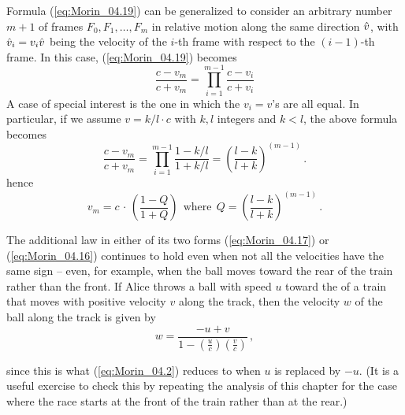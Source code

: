 \parindent=0pt  %
\parbox{\textwidth}{\begin{mdframed}[style=MyFrame] %
Formula (\ref{eq:Morin_04.19}) can be generalized to consider an arbitrary number $m+1$ of frames $F_0, F_1, \ldots, F_{m}$ in relative motion along the same direction $\hat{v}$, with $\hat{v}_i = v_i \hat{v}$ being the velocity of the $i$-th frame with respect to the $(i-1)$-th frame. 
In this case, (\ref{eq:Morin_04.19}) becomes 
\begin{equation*}
\frac{c - v_m}{c + v_m} = \prod_{i=1}^{m-1} \frac{c - v_i}{c + v_i} 
\end{equation*}
A case of special interest is the one in which the $v_i = v$'s are all equal. In particular, if we assume $v = k/l \cdot c$ with $k,l$ integers and $k < l$, the above formula becomes 
\begin{equation*}
\frac{c - v_m}{c + v_m} = \prod_{i=1}^{m-1} \frac{1 - k/l}{1 + k/l} = \left( \frac{l-k}{l+k} \right)^{(m-1)}\,.
\end{equation*}
hence
\begin{equation*}
v_m = c \, \cdot \, \left( \frac{1 - Q}{1 + Q} \right)\:\: \text{where}\:\: Q = \left( \frac{l-k}{l+k} \right)^{(m-1)}\,.
\end{equation*}

\end{mdframed}} %
\parindent=10pt %

The additional law in either of its two forms (\ref{eq:Morin_04.17}) or (\ref{eq:Morin_04.16}) continues to hold even when not all the velocities have the same sign -- even, for example, when the ball moves toward the rear of the train rather than the front. If Alice throws a ball with speed $u$ toward the  of a train that moves with positive velocity $v$ along the track, then the velocity $w$ of the ball along the track is given by
\begin{equation}\label{eq:Morin_04.20}
w = \frac{-u + v}{1 - \left( \frac{u}{c}\right) \left( \frac{v}{c}\right)}\,,
\end{equation}

since this is what (\ref{eq:Morin_04.2}) reduces to when $u$ is replaced by $-u$. (It is a useful exercise to check this by repeating the analysis of this chapter for the case where the race starts at the front of the train rather than at the rear.)

